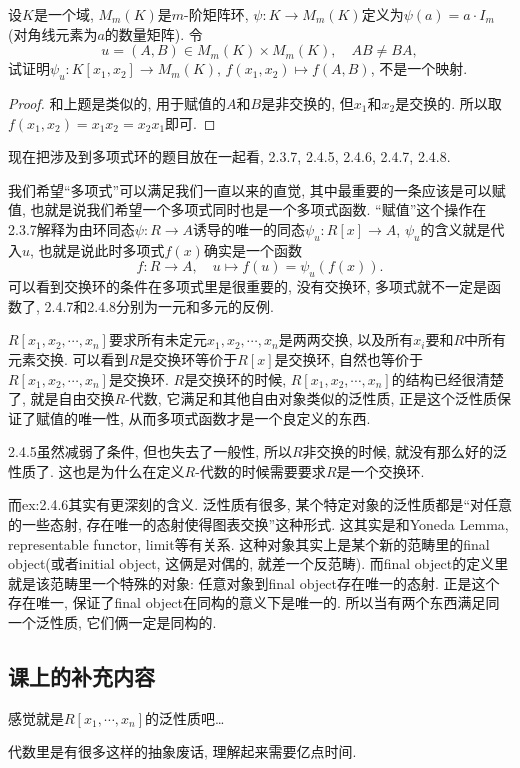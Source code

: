 \documentclass{../solutions-cn}
\begin{document}
\begin{exercise}[习题2.4.8]
    设$K$是一个域, $M_m(K)$是$m$-阶矩阵环, $\psi:K \to M_m(K)$定义为$\psi(a) = a \cdot I_{m}$(对角线元素为$a$的数量矩阵). 令
\[
    u = (A, B) \in M_m(K) \times M_m(K),\quad AB \neq BA,
\]
试证明$\psi_u:K[x_1, x_2] \to M_m(K),\, f(x_1, x_2) \mapsto f(A, B)$, 不是一个映射.
\end{exercise}

\begin{proof}
    和上题是类似的, 用于赋值的$A$和$B$是非交换的, 但$x_1$和$x_2$是交换的. 所以取$f(x_1, x_2) = x_1x_2 = x_2x_1$即可.
\end{proof}

\begin{remark}
    现在把涉及到多项式环的题目放在一起看, 2.3.7, 2.4.5, 2.4.6, 2.4.7, 2.4.8.
    
    我们希望“多项式”可以满足我们一直以来的直觉, 其中最重要的一条应该是可以赋值, 也就是说我们希望一个多项式同时也是一个多项式函数. “赋值”这个操作在2.3.7解释为由环同态$\psi:R \to A$诱导的唯一的同态$\psi_u:R[x] \to A$, $\psi_u$的含义就是代入$u$, 也就是说此时多项式$f(x)$确实是一个函数
    \[
        f:R \to A,\quad u \mapsto f(u) = \psi_u(f(x)).
    \]
    可以看到交换环的条件在多项式里是很重要的, 没有交换环, 多项式就不一定是函数了, 2.4.7和2.4.8分别为一元和多元的反例.
    
    $R[x_1, x_2, \cdots, x_n]$要求所有未定元$x_1, x_2, \cdots, x_n$是两两交换, 以及所有$x_i$要和$R$中所有元素交换. 可以看到$R$是交换环等价于$R[x]$是交换环, 自然也等价于$R[x_1, x_2, \cdots, x_n]$是交换环. $R$是交换环的时候, $R[x_1, x_2, \cdots, x_n]$的结构已经很清楚了, 就是自由交换$R$-代数, 它满足和其他自由对象类似的泛性质, 正是这个泛性质保证了赋值的唯一性, 从而多项式函数才是一个良定义的东西.

    2.4.5虽然减弱了条件, 但也失去了一般性, 所以$R$非交换的时候, 就没有那么好的泛性质了. 这也是为什么在定义$R$-代数的时候需要要求$R$是一个交换环.

    而ex:2.4.6其实有更深刻的含义. 泛性质有很多, 某个特定对象的泛性质都是“对任意的一些态射, 存在唯一的态射使得图表交换”这种形式. 这其实是和Yoneda Lemma, representable functor, limit等有关系. 这种对象其实上是某个新的范畴里的final object(或者initial object, 这俩是对偶的, 就差一个反范畴). 而final object的定义里就是该范畴里一个特殊的对象: 任意对象到final object存在唯一的态射. 正是这个存在唯一, 保证了final object在同构的意义下是唯一的. 所以当有两个东西满足同一个泛性质, 它们俩一定是同构的.
\end{remark}

\subsection*{课上的补充内容}
感觉就是$R[x_1, \cdots, x_n]$的泛性质吧\dots

代数里是有很多这样的抽象废话, 理解起来需要亿点时间.
\end{document}
